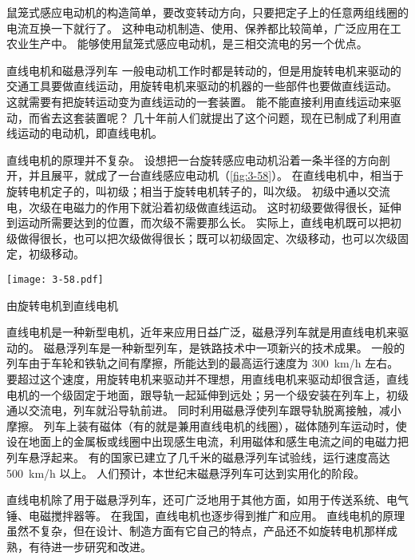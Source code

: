 鼠笼式感应电动机的构造简单，要改变转动方向，只要把定子上的任意两组线圈的电流互换一下就行了。
这种电动机制造、使用、保养都比较简单，广泛应用在工农业生产中。
能够使用鼠笼式感应电动机，是三相交流电的另一个优点。

\begin{Reading}{直线电机和磁悬浮列车}
一般电动机工作时都是转动的，但是用旋转电机来驱动的交通工具要做直线运动，用旋转电机来驱动的机器的一些部件也要做直线运动。
这就需要有把旋转运动变为直线运动的一套装置。
能不能直接利用直线运动来驱动，而省去这套装置呢？
几十年前人们就提出了这个问题，现在已制成了利用直线运动的电动机，即直线电机。

直线电机的原理并不复杂。
设想把一台旋转感应电动机沿着一条半径的方向剖开，并且展平，就成了一台直线感应电动机（\cref{fig:3-58}）。
在直线电机中，相当于旋转电机定子的，叫初级；相当于旋转电机转子的，叫次级。
初级中通以交流电，次级在电磁力的作用下就沿着初级做直线运动。
这时初级要做得很长，延伸到运动所需要达到的位置，而次级不需要那么长。
实际上，直线电机既可以把初级做得很长，也可以把次级做得很长；既可以初级固定、次级移动，也可以次级固定，初级移动。
\begin{figurehere}
  \begin{minipage}{\linewidth}\centering
    \texttt{[image: 3-58.pdf]}
    \caption{由旋转电机到直线电机}\label{fig:3-58}
  \end{minipage}
\end{figurehere}

直线电机是一种新型电机，近年来应用日益广泛，磁悬浮列车就是用直线电机来驱动的。
磁悬浮列车是一种新型列车，是铁路技术中一项新兴的技术成果。
一般的列车由于车轮和铁轨之间有摩擦，所能达到的最高运行速度为 \qty{300}{km/h} 左右。
要超过这个速度，用旋转电机来驱动并不理想，用直线电机来驱动却很含适，直线电机的一个级固定于地面，跟导轨一起延伸到远处；另一个级安装在列车上，初级通以交流电，列车就沿导轨前进。
同时利用磁悬浮使列车跟导轨脱离接触，减小摩擦。
列车上装有磁体（有的就是兼用直线电机的线圈），磁体随列车运动时，使设在地面上的金属板或线圈中出现感生电流，利用磁体和感生电流之间的电磁力把列车悬浮起来。
有的国家已建立了几千米的磁悬浮列车试验线，运行速度高达 \qty{500}{km/h} 以上。
人们预计，本世纪末磁悬浮列车可达到实用化的阶段。

直线电机除了用于磁悬浮列车，还可广泛地用于其他方面，如用于传送系统、电气锤、电磁搅拌器等。
在我国，直线电机也逐步得到推广和应用。
直线电机的原理虽然不复杂，但在设计、制造方面有它自己的特点，产品还不如旋转电机那样成熟，有待进一步研究和改进。
\end{Reading}

